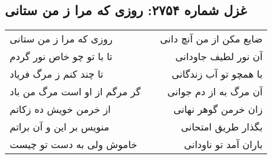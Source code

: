 \begin{center}
\section*{غزل شماره ۲۷۵۴: روزی که مرا ز من ستانی}
\label{sec:2754}
\begin{longtable}{l p{0.5cm} r}
روزی که مرا ز من ستانی
&&
ضایع مکن از من آنچ دانی
\\
تا با تو چو خاص نور گردم
&&
آن نور لطیف جاودانی
\\
تا چند کنم ز مرگ فریاد
&&
با همچو تو آب زندگانی
\\
گر مرگم از او است مرگ من باد
&&
آن مرگ به از دم جوانی
\\
از خرمن خویش ده زکاتم
&&
زان خرمن گوهر نهانی
\\
منویس بر این و آن براتم
&&
بگذار طریق امتحانی
\\
خاموش ولی به دست تو چیست
&&
باران آمد تو ناودانی
\\
\end{longtable}
\end{center}
